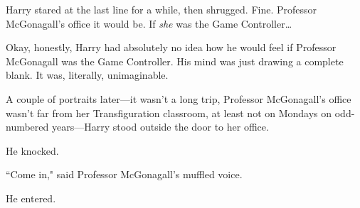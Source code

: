 Harry stared at the last line for a while, then shrugged. Fine. Professor McGonagall's office it would be. If \emph{she} was the Game Controller…

Okay, honestly, Harry had absolutely no idea how he would feel if Professor McGonagall was the Game Controller. His mind was just drawing a complete blank. It was, literally, unimaginable.

A couple of portraits later—it wasn't a long trip, Professor McGonagall's office wasn't far from her Transfiguration classroom, at least not on Mondays on odd-numbered years—Harry stood outside the door to her office.

He knocked.

``Come in," said Professor McGonagall's muffled voice.

He entered.

